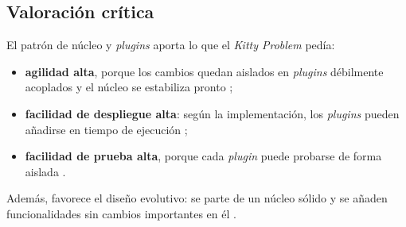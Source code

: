 \subsection*{Valoración crítica}
\label{sec:p5-valoracion}

El patrón de núcleo y \emph{plugins} aporta lo que el \emph{Kitty Problem} pedía:
\begin{itemize}
  \item \textbf{agilidad alta}, porque los cambios quedan aislados en \emph{plugins}
        débilmente acoplados y el núcleo se estabiliza pronto
        \parencite[25]{richards2015};
  \item \textbf{facilidad de despliegue alta}: según la implementación, los
        \emph{plugins} pueden añadirse en tiempo de ejecución
        \parencite[25]{richards2015};
  \item \textbf{facilidad de prueba alta}, porque cada \emph{plugin} puede probarse de
        forma aislada \parencite[26]{richards2015}.
\end{itemize}
Además, favorece el diseño evolutivo: se parte de un núcleo sólido y se añaden
funcionalidades sin cambios importantes en él \parencite[24--25]{richards2015}.

